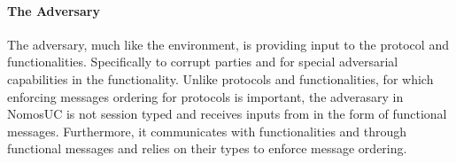 %


\paragraph{The Adversary}
The adversary, much like the environment, is providing input to the protocol and functionalities. Specifically to corrupt parties and for special adversarial capabilities in the functionality.
Unlike protocols and functionalities, for which enforcing messages ordering for protocols is important, the adverasary in NomosUC is not session typed and receives inputs from \Z in the form of functional messages.
Furthermore, it communicates with functionalities and \pw through functional messages and relies on their types to enforce message ordering.

